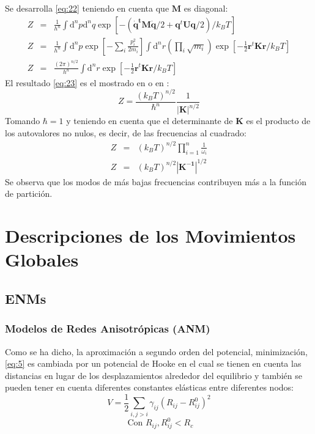 Se desarrolla \eqref{eq:22} teniendo en cuenta que $\mathbf{M}$ es diagonal:
\begin{eqnarray}\label{eq:23}
Z&=&\frac{1}{h^{n}}\int \mathrm{d}^n p\mathrm{d}^n q \exp \left [-\left( \mathbf{\dot{q}^t}\mathbf{M}\mathbf{\dot{q}}/2+\mathbf{q}^t\mathbf{U}\mathbf{q}/2\right)/k_BT \right]
\nonumber \\
Z&=&\frac{1}{h^{n}}\int \mathrm{d}^n p \exp \left [-\sum_i \frac{p_i^2}{2m_i}\right]
\int \mathrm{d}^n r \left( \prod_i \sqrt{m_i}\right)\exp \left[-\frac{1}{2}\mathbf{r}^t\mathbf{K}\mathbf{r}/k_BT \right]
\nonumber \\
Z&=&\frac{(2\pi)^{n/2}}{h^{n}}
\int \mathrm{d}^n r\exp \left[-\frac{1}{2}\mathbf{r}^t\mathbf{K}\mathbf{r}/k_BT \right] 
\end{eqnarray}
El resultado \eqref{eq:23} es el mostrado en \cite{Lezon2009} o en \cite{Sethna2006}:
\begin{equation}\label{eq:24}
Z=\frac{\left(k_BT\right)^{n/2}}{\hbar^{n}} \frac{1}{|\mathbf{K}|^{n/2}}
\end{equation}
Tomando $\hbar=1$ y teniendo en cuenta que el determinante de $\mathbf{K}$ es el producto de los autovalores no nulos, es decir, de las frecuencias al cuadrado:
\begin{eqnarray}\label{eq:25}
Z&=&\left(k_BT\right)^{n/2} \prod_{i=1}^{n}\frac{1}{\omega_i}
 \\
Z&=&\left(k_BT\right)^{n/2} |\mathbf{K^{-1}}|^{1/2}
\end{eqnarray}
Se observa que los modos de m\'{a}s bajas frecuencias contribuyen m\'{a}s a la funci\'{o}n de partici\'{o}n.
\section{Descripciones de los Movimientos Globales}
\subsection{ENMs}
\subsubsection{Modelos de Redes Anisotr\'{o}picas (ANM)}
Como se ha dicho, la aproximaci\'{o}n a segundo orden del potencial, minimizaci\'{o}n, \eqref{eq:5} es cambiada por un potencial de Hooke en el cual se tienen en cuenta las distancias en lugar de los desplazamientos alrededor del equilibrio y tambi\'{e}n se pueden tener en cuenta diferentes constantes el\'{a}sticas entre diferentes nodos:
\begin{equation}\label{eq:26}
V=
   \frac{1}{2}\sum_{
   i,j>i  
   }
   \gamma_{ij}\left(R_{ij}-R_{ij}^0\right)^2
\end{equation}
\begin{equation*}
\mbox{			Con		} R_{ij},R_{ij}^0<R_c  
\end{equation*}

